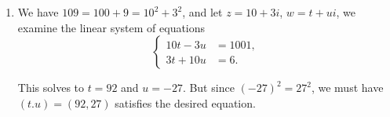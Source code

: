 \begin{enumerate}
    \item We have \(109 = 100 + 9 = 10^2 + 3^2\), and let \(z = 10 + 3i\), \(w = t + ui\), we examine the linear system of equations
          \[
              \left\{
              \begin{aligned}
                  10t - 3u & = 1001, \\
                  3t + 10u & = 6.
              \end{aligned}
              \right.
          \]

          This solves to \(t = 92\) and \(u = -27\). But since \((-27)^2 = 27^2\), we must have \((t. u) = (92, 27)\) satisfies the desired equation.
\end{enumerate}